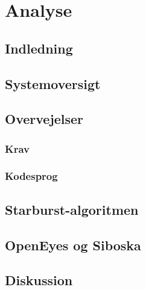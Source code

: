\documentclass[rapport.tex]{subfiles}
\begin{document}
\section{Analyse}
	\subsection{Indledning}
	\subsection{Systemoversigt}
	\subsection{Overvejelser}
		\subsubsection{Krav}
		\subsubsection{Kodesprog}
	\subsection{Starburst-algoritmen}
	\subsection{OpenEyes og Siboska}
	\subsection{Diskussion}
		
\end{document}
